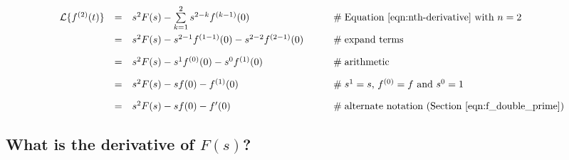 \documentclass{article}
\theoremstyle{definition}
\begin{document}
\begin{equation*}
\begin{array}{lllll}
\mathcal{L}\{f^{(2)}(t)\}  
&=&  s^{2}F(s)- \sum\limits_{k=1}^2 s^{2-k} f^{(k-1)}(0)                                         &\qquad \mathrel{\#} \text{Equation \ref{eqn:nth-derivative} with $n = 2$}               \\
[10pt]
&=&  s^{2}F(s)- s^{2-1}f^{(1-1)}(0)  - s^{2-2}f^{(2-1)}(0)                                         &\qquad \mathrel{\#} \text{expand terms}                                                                  \\
[10pt]
&=&  s^{2}F(s)- s^{1}f^{(0)}(0)  - s^0f^{(1)}(0)                                                        &\qquad \mathrel{\#} \text{arithmetic}                                                                        \\
[10pt]
&=&  s^{2}F(s)- sf(0)  - f^{(1)}(0)                                                                            &\qquad \mathrel{\#} \text{$s^1 = s$, $f^{(0)} = f$ and $s^0 = 1$}                             \\
[10pt]
&=& s^{2}F(s)- sf(0)  - f^{\prime}(0)                                                                       &\qquad \mathrel{\#} \text{alternate notation (Section \ref{eqn:f_double_prime})}
\end{array}
\end{equation*}


\subsection{What is the derivative of $F(s)$?}
\end{document}
